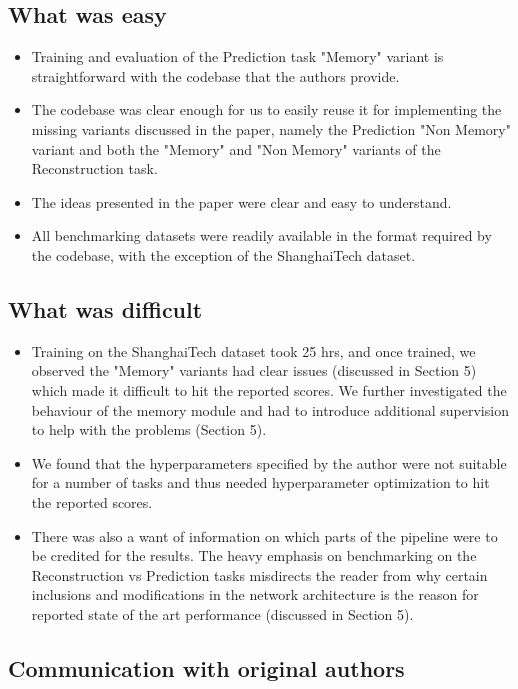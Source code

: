 \subsection{What was easy}
\begin{itemize}
    \item  Training and evaluation of the Prediction task "Memory" variant is straightforward with the codebase that the authors provide. 
    \item The codebase was clear enough for us to easily reuse it for implementing the missing variants discussed in the paper, namely the Prediction "Non Memory" variant and both the "Memory" and "Non Memory" variants of the Reconstruction task.
    \item The ideas presented in the paper were clear and easy to understand.
    \item All benchmarking datasets were readily available in the format required by the codebase, with the exception of the ShanghaiTech dataset\cite{Luo2017ARO}.
\end{itemize}
\subsection{What was difficult}
\begin{itemize}
    \item  Training on the ShanghaiTech dataset\cite{Luo2017ARO} took 25 hrs, and once trained, we observed the "Memory" variants had clear issues (discussed in Section 5) which made it difficult to hit the reported scores. We further investigated the behaviour of the memory module and had to introduce additional supervision to help with the problems (Section 5). 
    \item We found that the hyperparameters specified by the author were not suitable for a number of tasks and thus needed hyperparameter optimization to hit the reported scores.
    \item There was also a want of information on which parts of the pipeline were to be credited for the results. The heavy emphasis on benchmarking on the Reconstruction vs Prediction tasks misdirects the reader from why certain inclusions and modifications in the network architecture is the reason for reported state of the art performance (discussed in Section 5).  
\end{itemize}

\subsection{Communication with original authors}
 
